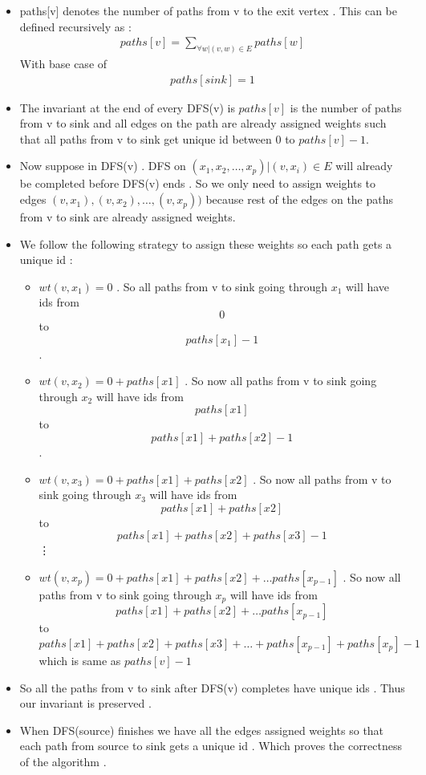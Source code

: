 \documentclass[11pt]{article}
\begin{document}
\begin{itemize}
\item paths[v] denotes the number of paths from v to the exit vertex . This can be defined recursively as :
\begin{align*}
paths[v] = \sum_{\forall w | (v,w) \in E}{paths[w]}
\end{align*}
With base case of 
\begin{align*}
paths[sink] = 1
\end{align*}
\item The invariant at the end of every DFS(v) is $paths[v]$ is the number of paths from v to sink and all edges on the path are already assigned weights such that all paths from v to sink get unique id between 0 to $paths[v]-1$. 
\item Now suppose in DFS(v) . DFS on $(x_1,x_2,\ldots,x_p)|(v,x_i)\in E$ will already be completed before DFS(v) ends . So we only need to assign weights to edges $(v,x_1),(v,x_2),\ldots,(v,x_p))$ because rest of the edges on the paths from v to sink are already assigned weights. 
\item We follow the following strategy to assign these weights so each path gets a unique id :
\begin{itemize}
\item $wt(v,x_1) = 0$ . So all paths from v to sink going through $x_1$ will have ids from \[0\] to \[paths[x_1]-1\].
\item $wt(v,x_2) = 0 + paths[x1]$ . So now all  paths from v to sink going through $x_2$ will have ids from \[paths[x1]\] to \[paths[x1] + paths[x2] -1\] .
\item $wt(v,x_3) = 0 + paths[x1] + paths[x2]$ . So now all  paths from v to sink going through $x_3$ will have ids from \[paths[x1] + paths[x2]\] to \[paths[x1] + paths[x2]  + paths[x3]-1\]
\vdots 
\item $wt(v,x_p) = 0 + paths[x1] + paths[x2] + \ldots paths[x_{p-1}]$ . So now all  paths from v to sink going through $x_p$ will have ids from \[paths[x1] + paths[x2] + \ldots paths[x_{p-1}]\] to \[paths[x1] + paths[x2]  + paths[x3]+ \ldots +paths[x_{p-1}] + paths[x_p]-1 \] which is same as $ paths[v] -1$ 

\end{itemize}
\item So all the paths from v to sink after DFS(v) completes have unique ids . Thus our invariant is preserved . 
\item When DFS(source) finishes we have all the edges assigned weights so that each path from source to sink gets a unique id . Which proves the correctness of the algorithm . 
\end{itemize}
\pagebreak
\end{document}
